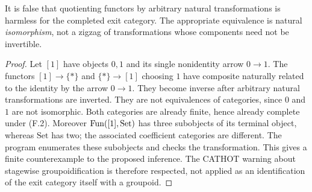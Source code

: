 It is false that quotienting functors by arbitrary natural transformations is harmless for the completed exit category. The appropriate equivalence is natural \emph{isomorphism}, not a zigzag of transformations whose components need not be invertible.
\begin{proof}
Let $[1]$ have objects $0,1$ and its single nonidentity arrow $0\to1$. The functors $[1]\to\{*\}$ and $\{*\}\to[1]$ choosing $1$ have composite naturally related to the identity by the arrow $0\to1$. They become inverse after arbitrary natural transformations are inverted. They are not equivalences of categories, since $0$ and $1$ are not isomorphic. Both categories are already finite, hence already complete under (F.2). Moreover $\operatorname{Fun}([1],\mathrm{Set})$ has three subobjects of its terminal object, whereas $\mathrm{Set}$ has two; the associated coefficient categories are different. The program enumerates these subobjects and checks the transformation. This gives a finite counterexample to the proposed inference. The CATHOT warning about stagewise groupoidification is therefore respected, not applied as an identification of the exit category itself with a groupoid.
\end{proof}

